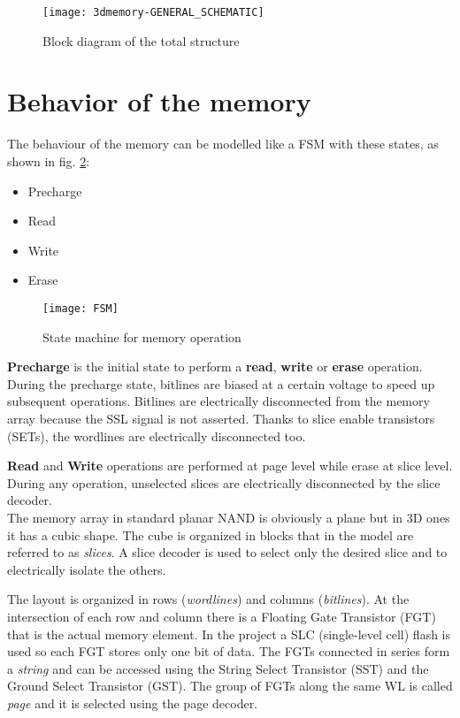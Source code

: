 \begin{center}
	\begin{figure}[H]
		\centering
		\texttt{[image: 3dmemory-GENERAL\_SCHEMATIC]}
		\caption{Block diagram of the total structure}
		\label{fig:3dmemory}
	\end{figure}
\end{center}

\section{Behavior of the memory}
The behaviour of the memory can be modelled like a FSM with these states, as shown in fig. \ref{fig:fsm}:

\begin{itemize}[noitemsep, topsep=0pt]
\item Precharge
\item Read
\item Write
\item Erase
\end{itemize}

\begin{center}
	\begin{figure}[H]
		\centering
		\texttt{[image: FSM]}
		\caption{State machine for memory operation}
		\label{fig:fsm}
	\end{figure}
\end{center}

\textbf{Precharge} is the initial state to perform a \textbf{read}, \textbf{write} or \textbf{erase} operation. During the precharge state, bitlines are biased at a certain voltage to speed up subsequent operations. Bitlines are electrically disconnected from the memory array because the SSL signal is not asserted. Thanks to slice enable transistors (SETs), the wordlines are electrically disconnected too.

\textbf{Read} and \textbf{Write} operations are performed at page level while erase at slice level. During any operation, unselected slices are electrically disconnected by the slice decoder.\\

The memory array in standard planar NAND is obviously a plane but in 3D ones it has a cubic shape. The cube is organized in blocks that in the model are referred to as \textit{slices}. A slice decoder is used to select only the desired slice and to electrically isolate the others.

The layout is organized in rows (\textit{wordlines}) and columns (\textit{bitlines}). At the intersection of each row and column there is a Floating Gate Transistor (FGT) that is the actual memory element. In the project a SLC (single-level cell) flash is used so each FGT stores only one bit of data. The FGTs connected in series form a \textit{string} and can be accessed using the String Select Transistor (SST) and the Ground Select Transistor (GST). The group of FGTs along the same WL is called \textit{page} and it is selected using the page decoder.

